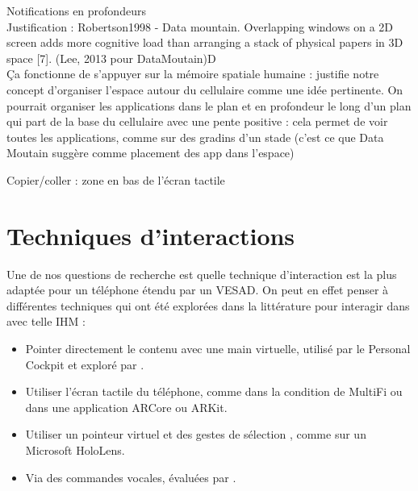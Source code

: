 Notifications en profondeurs\\
Justification : Robertson1998 - Data mountain. Overlapping windows on a 2D screen adds more cognitive load than arranging a stack of physical papers in  3D space [7]. (Lee, 2013 pour DataMoutain)D\\
Ça fonctionne de s'appuyer sur la mémoire spatiale humaine : justifie notre concept d'organiser l'espace autour du cellulaire comme une idée pertinente. On pourrait organiser les applications dans le plan et en profondeur le long d'un plan qui part de la base du cellulaire avec une pente positive : cela permet de voir toutes les applications, comme sur des gradins d'un stade (c'est ce que Data Moutain suggère comme placement des app dans l'espace)

Copier/coller : zone en bas de l'écran tactile


\section{Techniques d'interactions}
\label{sec:concept_interaction_techniques}

Une de nos questions de recherche  est quelle technique d'interaction est la plus adaptée pour un téléphone étendu par un VESAD. On peut en effet penser à différentes techniques qui ont été explorées dans la littérature pour interagir dans avec telle IHM :

\begin{itemize}
  \item Pointer directement le contenu avec une main virtuelle, utilisé par le Personal Cockpit \cite{Ens2014} et exploré par \cite{Piumsomboon2013}.
  \item Utiliser l'écran tactile du téléphone, comme dans la condition  de MultiFi \citep{Grubert2015} ou dans une application ARCore ou ARKit.
  \item Utiliser un pointeur virtuel et des gestes de sélection \cite{Wilson2006}, comme sur un Microsoft HoloLens.
  \item Via des commandes vocales, évaluées par \cite{Piumsomboon2014}.
\end{itemize}
\bigskip


